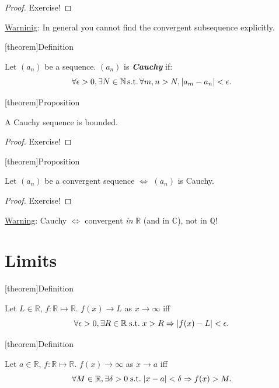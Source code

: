 \documentclass[12pt]{report}
\theoremstyle{definition}
\begin{document}
\begin{proof}
    Exercise!
\end{proof}

\underline{Warninig}: In general you cannot find the convergent subsequence explicitly.

[theorem]{Definition}
\begin{Cauchy sequence}
    Let $(a_n)$ be a sequence. $(a_n)$ is \textbf{\emph{Cauchy}} if:\[
        \forall \epsilon > 0, \exists N \in \mathbb{N} \,\textnormal{s.t.}\,
        \forall m,n>N, |a_m - a_n| < \epsilon.
    \]
\end{Cauchy sequence}

[theorem]{Proposition}
\begin{Cauchy sequence is bounded}
    A Cauchy sequence is bounded.
\end{Cauchy sequence is bounded}

\begin{proof}
    Exercise!
\end{proof}

[theorem]{Proposition}
\begin{convergent is cauchy}
    Let $(a_n)$ be a convergent sequence $\iff$ $(a_n)$ is Cauchy.
\end{convergent is cauchy}

\begin{proof}
    Exercise!
\end{proof}

\underline{Warning}: Cauchy $\iff$ convergent \emph{in} $\mathbb{R}$ 
(and in $\mathbb{C}$), not in $\mathbb{Q}$!

\section{Limits}

[theorem]{Definition}
\begin{f tends to L as x tends to infinity}
    Let $L \in \mathbb{R}$, $f:\mathbb{R}\mapsto\mathbb{R}$. 
    $f(x)\rightarrow{}L$ as $x \rightarrow{}\infty$ iff\[
        \forall \epsilon > 0, \exists R\in \mathbb{R} 
        \;\textnormal{s.t.}\;x>R\Rightarrow{}
        |f(x)-L|<\epsilon.
    \]
\end{f tends to L as x tends to infinity}

[theorem]{Definition}
\begin{f tends to infinity as x tends to a}
    Let $a \in \mathbb{R}$, $f:\mathbb{R}\mapsto\mathbb{R}$. 
    $f(x)\rightarrow{}\infty$ as $x\rightarrow{}a$ iff\[
        \forall M\in\mathbb{R}, \exists \delta>0 \;\textnormal{s.t.}\;
        |x-a|<\delta \Rightarrow{}f(x)>M.
    \]
\end{f tends to infinity as x tends to a}
\end{document}
